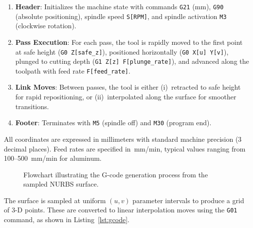 \documentclass[a4paper,12pt]{article}
\begin{document}
\begin{enumerate}
  \item \textbf{Header}: Initializes the machine state with commands
    \texttt{G21} (mm), \texttt{G90} (absolute positioning), spindle speed
    \texttt{S[RPM]}, and spindle activation \texttt{M3} (clockwise rotation).

  \item \textbf{Pass Execution}: For each pass, the tool is rapidly moved to
    the first point at safe height (\texttt{G0 Z[safe\_z]}), positioned
    horizontally (\texttt{G0 X[u] Y[v]}), plunged to cutting depth
    (\texttt{G1 Z[z] F[plunge\_rate]}), and advanced along the toolpath with
    feed rate \texttt{F[feed\_rate]}.

  \item \textbf{Link Moves}: Between passes, the tool is either (i)~retracted
    to safe height for rapid repositioning, or (ii)~interpolated along the
    surface for smoother transitions.

  \item \textbf{Footer}: Terminates with \texttt{M5} (spindle off) and
    \texttt{M30} (program end).
\end{enumerate}

All coordinates are expressed in millimeters with standard machine precision
(3 decimal places). Feed rates are specified in~mm/min, typical values ranging
from 100--500~mm/min for aluminum.

\begin{figure}[H]
  \centering
  \caption{Flowchart illustrating the G-code generation process from the
           sampled NURBS surface.}
  \label{fig:flowchart}
\end{figure}

The surface is sampled at uniform $(u, v)$ parameter intervals to produce a
grid of 3-D points.  These are converted to linear interpolation moves using
the \texttt{G01} command, as shown in Listing~\ref{lst:gcode}.
\end{document}
